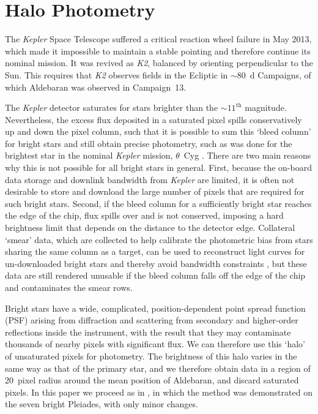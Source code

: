 \documentclass[modern]{aastex61}
\newcommand{\kepler}{\emph{Kepler}\xspace}
\newcommand{\ktwo}{\emph{K2}\xspace}
\begin{document}
\section{Halo Photometry}
\label{halo}

The \kepler Space Telescope \citep{2010sci...327..977b}
suffered a critical reaction wheel failure in May 2013, which made it impossible to maintain a stable pointing and therefore continue its nominal mission. It was revived as \ktwo \citep{howell14}, balanced by orienting perpendicular to the Sun. This requires that \ktwo observes fields in the Ecliptic in $\sim80$~d Campaigns, of which Aldebaran was observed in Campaign~13.

The \kepler detector saturates for stars brighter than the $\sim11^\text{th}$ magnitude. Nevertheless, the excess flux deposited in a saturated pixel spills conservatively up and down the pixel column, such that it is possible to sum this `bleed column' for bright stars and still obtain precise photometry, such as was done for the brightest star in the nominal \kepler mission, $\theta$~Cyg \citep[$V = 4.48$;][]{guzik2011,thetacygwhite,guzik2016}. There are two main reasons why this is not possible for all bright stars in general. First, because the on-board data storage and downlink bandwidth from \kepler are limited, it is often not desirable to store and download the large number of pixels that are required for such bright stars. Second, if the bleed column for a sufficiently bright star reaches the edge of the chip, flux spills over and is not conserved, imposing a hard brightness limit that depends on the distance to the detector edge.
Collateral `smear' data, which are collected to help calibrate the photometric bias from stars sharing the same column as a target, can be used to reconstruct light curves for un-downloaded bright stars and thereby avoid bandwidth constraints \citep{k2smear}, but these data are still rendered unusable if the bleed column falls off the edge of the chip and contaminates the smear rows.

Bright stars have a wide, complicated, position-dependent point spread function (PSF) arising from diffraction and scattering from secondary and higher-order reflections inside the instrument, with the result that they may contaminate thousands of nearby pixels with significant flux. We can therefore use this `halo' of unsaturated pixels for photometry. The brightness of this halo varies in the same way as that of the primary star, and we therefore obtain data in a region of 20~pixel radius around the mean position of Aldebaran, and discard saturated pixels.
In this paper we proceed as in \citet{White2017}, in which the method was demonstrated on the seven bright Pleiades, with only minor changes.
\end{document}
